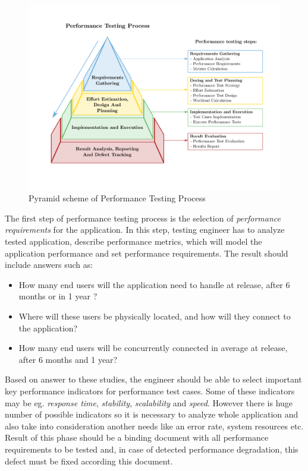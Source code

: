 \begin{figure}[H]
  \centering
  \includegraphics[width=16cm]{obrazky-figures/pyramid.pdf}
  \caption{Pyramid scheme of Performance Testing Process }
  \label{fig:performace_testing_process}
\end{figure}

The first step of performance testing process is the selection of \emph{performance requirements} for the application. In this step, testing engineer has to analyze tested application, describe performance metrics, which will model the application performance and set performance requirements. The result should include answers such as:

\begin{itemize}
	\setlength\itemsep{0em}
	\item How many end users will the application need to handle at release, after 6 months or in 1 year ?
	\item Where will these users be physically located, and how will they connect to the application?
	\item How many end users will be concurrently connected in average at release, after 6 months and 1 year?
\end{itemize}

Based on answer to these studies, the engineer should be able to select important key performance indicators for performance test cases. Some of these indicators may be eg. \emph{response time}, \emph{stability}, \emph{scalability} and \emph{speed}. However there is huge number of possible indicators so it is necessary to analyze whole application and also take into consideration another needs like an error rate, system resources etc.  Result of this phase should be a binding document with all performance requirements to be tested and, in case of detected performance degradation, this defect must be fixed according this document.

